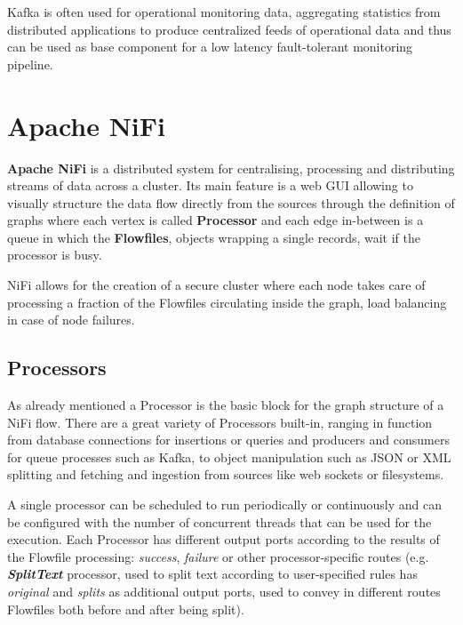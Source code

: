 Kafka is often used for operational monitoring data, aggregating statistics from distributed applications to produce centralized feeds of operational data and thus can be used as base component for a low latency fault-tolerant monitoring pipeline.


\section{Apache NiFi}

\textbf{Apache NiFi} is a distributed system for centralising, processing and distributing streams of data across a cluster. Its main feature is a web GUI allowing to visually structure the data flow directly from the sources through the definition of graphs where each vertex is called \textbf{Processor} and each edge in-between is a queue in which the \textbf{Flowfiles}, objects wrapping a single records, wait if the processor is busy.

NiFi allows for the creation of a secure cluster where each node takes care of processing a fraction of the Flowfiles circulating inside the graph, load balancing in case of node failures. 

\subsection{Processors}

As already mentioned a Processor is the basic block for the graph structure of a NiFi flow. There are a great variety of Processors built-in, ranging in function from database connections for insertions or queries and producers and consumers for queue processes such as Kafka, to object manipulation such as JSON or XML splitting and fetching and ingestion from sources like web sockets or filesystems.

A single processor can be scheduled to run periodically or continuously and can be configured with the number of concurrent threads that can be used for the execution. Each Processor has different output ports according to the results of the Flowfile processing: \textit{success}, \textit{failure} or other processor-specific routes (e.g. \textit{\textbf{SplitText}} processor, used to split text according to user-specified rules has \textit{original} and \textit{splits} as additional output ports, used to convey in different routes Flowfiles both before and after being split).